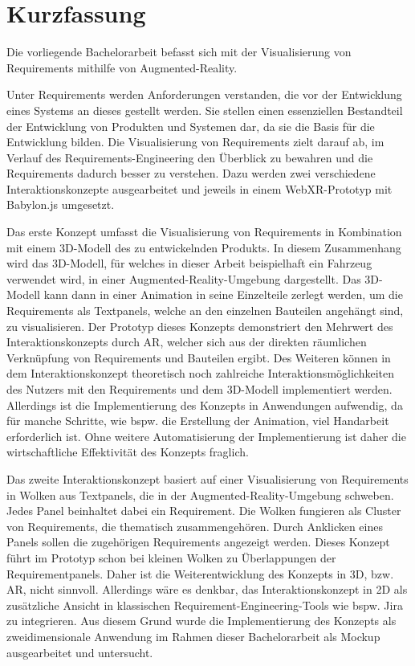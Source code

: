\chapter{Kurzfassung} %

Die vorliegende Bachelorarbeit befasst sich mit der Visualisierung von Requirements mithilfe von Augmented-Reality.

Unter Requirements werden Anforderungen verstanden, die vor der Entwicklung eines Systems an dieses gestellt werden.
Sie stellen einen essenziellen Bestandteil der Entwicklung von Produkten und Systemen dar, da sie die Basis für die Entwicklung bilden.
Die Visualisierung von Requirements zielt darauf ab, im Verlauf des Requirements-Engineering den Überblick zu bewahren und die Requirements dadurch besser zu verstehen.
Dazu werden zwei verschiedene Interaktionskonzepte ausgearbeitet und jeweils in einem WebXR-Prototyp mit Babylon.js umgesetzt.

Das erste Konzept umfasst die Visualisierung von Requirements in Kombination mit einem 3D-Modell des zu entwickelnden Produkts.
In diesem Zusammenhang wird das 3D-Modell, für welches in dieser Arbeit beispielhaft ein Fahrzeug verwendet wird, in einer Augmented-Reality-Umgebung dargestellt.
Das 3D-Modell kann dann in einer Animation in seine Einzelteile zerlegt werden, um die Requirements als Textpanels, welche an den einzelnen Bauteilen angehängt sind, zu visualisieren.\newline
Der Prototyp dieses Konzepts demonstriert den Mehrwert des Interaktionskonzepts durch AR, welcher sich aus der direkten räumlichen Verknüpfung von Requirements und Bauteilen ergibt.
Des Weiteren können in dem Interaktionskonzept theoretisch noch zahlreiche Interaktionsmöglichkeiten des Nutzers mit den Requirements und dem 3D-Modell implementiert werden.
Allerdings ist die Implementierung des Konzepts in Anwendungen aufwendig, da für manche Schritte, wie bspw. die Erstellung der Animation, viel Handarbeit erforderlich ist.
Ohne weitere Automatisierung der Implementierung ist daher die wirtschaftliche Effektivität des Konzepts fraglich.

Das zweite Interaktionskonzept basiert auf einer Visualisierung von Requirements in Wolken aus Textpanels, die in der Augmented-Reality-Umgebung schweben.
Jedes Panel beinhaltet dabei ein Requirement.
Die Wolken fungieren als Cluster von Requirements, die thematisch zusammengehören.
Durch Anklicken eines Panels sollen die zugehörigen Requirements angezeigt werden. \newline
Dieses Konzept führt im Prototyp schon bei kleinen Wolken zu Überlappungen der Requirementpanels.
Daher ist die Weiterentwicklung des Konzepts in 3D, bzw. AR, nicht sinnvoll.
Allerdings wäre es denkbar, das Interaktionskonzept in 2D als zusätzliche Ansicht in klassischen Requirement-Engineering-Tools wie bspw. Jira zu integrieren.
Aus diesem Grund wurde die Implementierung des Konzepts als zweidimensionale Anwendung im Rahmen dieser Bachelorarbeit als Mockup ausgearbeitet und untersucht.

